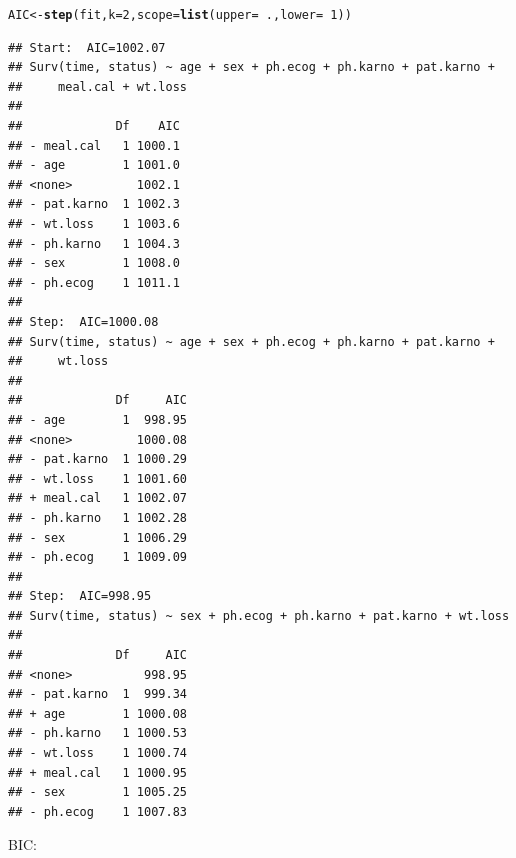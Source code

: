 \documentclass[12pt, a4paper]{article}\usepackage[]{graphicx}\usepackage[]{color}
\makeatletter
\newcommand{\hlnum}[1]{\textcolor[rgb]{0.686,0.059,0.569}{#1}}%
\newcommand{\hlopt}[1]{\textcolor[rgb]{0,0,0}{#1}}%
\newcommand{\hlstd}[1]{\textcolor[rgb]{0.345,0.345,0.345}{#1}}%
\newcommand{\hlkwb}[1]{\textcolor[rgb]{0.69,0.353,0.396}{#1}}%
\newcommand{\hlkwc}[1]{\textcolor[rgb]{0.333,0.667,0.333}{#1}}%
\newcommand{\hlkwd}[1]{\textcolor[rgb]{0.737,0.353,0.396}{\textbf{#1}}}%
\newenvironment{kframe}{%
 \def\at@end@of@kframe{}%
 \ifinner\ifhmode%
  \def\at@end@of@kframe{\end{minipage}}%
  \begin{minipage}{\columnwidth}%
 \fi\fi%
 \def\FrameCommand##1{\hskip\@totalleftmargin \hskip-\fboxsep
 \colorbox{shadecolor}{##1}\hskip-\fboxsep
     \hskip-\linewidth \hskip-\@totalleftmargin \hskip\columnwidth}%
 \MakeFramed {\advance\hsize-\width
   \@totalleftmargin\z@ \linewidth\hsize
   \@setminipage}}%
 {\par\unskip\endMakeFramed%
 \at@end@of@kframe}
\newenvironment{knitrout}{}{} %
\makeatother
\begin{document}
\begin{knitrout}
\color{fgcolor}\begin{kframe}
\begin{alltt}
\hlstd{AIC} \hlkwb{<-} \hlkwd{step}\hlstd{(fit,} \hlkwc{k} \hlstd{=} \hlnum{2}\hlstd{,} \hlkwc{scope} \hlstd{=} \hlkwd{list}\hlstd{(}\hlkwc{upper} \hlstd{=} \hlopt{~}\hlstd{.,} \hlkwc{lower} \hlstd{=} \hlopt{~}\hlnum{1}\hlstd{))}
\end{alltt}
\begin{verbatim}
## Start:  AIC=1002.07
## Surv(time, status) ~ age + sex + ph.ecog + ph.karno + pat.karno + 
##     meal.cal + wt.loss
## 
##             Df    AIC
## - meal.cal   1 1000.1
## - age        1 1001.0
## <none>         1002.1
## - pat.karno  1 1002.3
## - wt.loss    1 1003.6
## - ph.karno   1 1004.3
## - sex        1 1008.0
## - ph.ecog    1 1011.1
## 
## Step:  AIC=1000.08
## Surv(time, status) ~ age + sex + ph.ecog + ph.karno + pat.karno + 
##     wt.loss
## 
##             Df     AIC
## - age        1  998.95
## <none>         1000.08
## - pat.karno  1 1000.29
## - wt.loss    1 1001.60
## + meal.cal   1 1002.07
## - ph.karno   1 1002.28
## - sex        1 1006.29
## - ph.ecog    1 1009.09
## 
## Step:  AIC=998.95
## Surv(time, status) ~ sex + ph.ecog + ph.karno + pat.karno + wt.loss
## 
##             Df     AIC
## <none>          998.95
## - pat.karno  1  999.34
## + age        1 1000.08
## - ph.karno   1 1000.53
## - wt.loss    1 1000.74
## + meal.cal   1 1000.95
## - sex        1 1005.25
## - ph.ecog    1 1007.83
\end{verbatim}
\end{kframe}
\end{knitrout}

BIC: 
\end{document}
